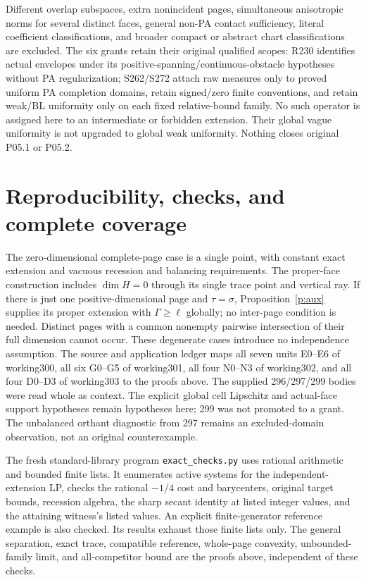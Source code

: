 \documentclass[11pt]{article}
\theoremstyle{definition}\newtheorem{definition}[theorem]{Definition}
\theoremstyle{remark}\newtheorem{remark}[theorem]{Remark}
\begin{document}
Different overlap subspaces, extra nonincident pages, simultaneous anisotropic norms for several distinct faces, general non-PA contact sufficiency, literal coefficient classifications, and broader compact or abstract chart classifications are excluded. The six grants retain their original qualified scopes: R230 identifies actual envelopes under its positive-spanning/continuous-obstacle hypotheses without PA regularization; S262/S272 attach raw measures only to proved uniform PA completion domains, retain signed/zero finite conventions, and retain weak/BL uniformity only on each fixed relative-bound family. No such operator is assigned here to an intermediate or forbidden extension. Their global vague uniformity is not upgraded to global weak uniformity. Nothing closes original P05.1 or P05.2.

\section{Reproducibility, checks, and complete coverage}
The zero-dimensional complete-page case is a single point, with constant exact extension and vacuous recession and balancing requirements. The proper-face construction includes $\dim H=0$ through its single trace point and vertical ray. If there is just one positive-dimensional page and $\tau=\sigma$, Proposition~\ref{p:aux} supplies its proper extension with $\Gamma\geq\ell$ globally; no inter-page condition is needed. Distinct pages with a common nonempty pairwise intersection of their full dimension cannot occur. These degenerate cases introduce no independence assumption.
The source and application ledger maps all seven units E0--E6 of working300, all six G0--G5 of working301, all four N0--N3 of working302, and all four D0--D3 of working303 to the proofs above. The supplied 296/297/299 bodies were read whole as context. The explicit global cell Lipschitz and actual-face support hypotheses remain hypotheses here; 299 was not promoted to a grant. The unbalanced orthant diagnostic from 297 remains an excluded-domain observation, not an original counterexample.

The fresh standard-library program \texttt{exact\_checks.py} uses rational arithmetic and bounded finite lists. It enumerates active systems for the independent-extension LP, checks the rational $-1/4$ cost and barycenters, original target bounds, recession algebra, the sharp secant identity at listed integer values, and the attaining witness's listed values. An explicit finite-generator reference example is also checked. Its results exhaust those finite lists only. The general separation, exact trace, compatible reference, whole-page convexity, unbounded-family limit, and all-competitor bound are the proofs above, independent of these checks.
\end{document}
